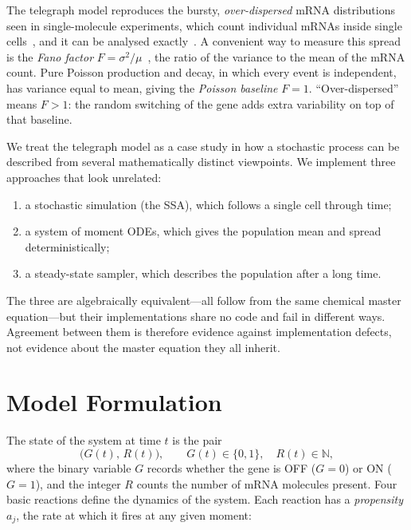 \documentclass[11pt]{article}
\begin{document}
The telegraph model reproduces the bursty, \emph{over-dispersed} mRNA distributions seen in single-molecule experiments,
which count individual mRNAs inside single cells~\cite{raj2006}, and it can be analysed exactly~\cite{peccoud1995}. 
A convenient way to measure this spread is the \emph{Fano factor} $F=\sigma^2/\mu$~\cite{fano1947}, the ratio of the variance to the mean of the mRNA count. 
Pure Poisson production and decay, in which every event is independent, has variance equal to mean, giving the \emph{Poisson baseline} $F=1$. 
``Over-dispersed'' means $F>1$: the random switching of the gene adds extra variability on top of that baseline.

We treat the telegraph model as a case study in how a stochastic process can be described from several mathematically distinct viewpoints. 
We implement three approaches that look unrelated:

\begin{enumerate}
  \item a stochastic simulation (the SSA), which follows a single cell through time;
  \item a system of moment ODEs, which gives the population mean and spread
    deterministically;
  \item a steady-state sampler, which describes the population after a long time.
\end{enumerate}

The three are algebraically equivalent---all follow from the same chemical master equation---but
their implementations share no code and fail in different ways. Agreement between them is therefore
evidence against implementation defects, not evidence about the master equation they all inherit.

\section{Model Formulation}
\label{sec:model}

The state of the system at time $t$ is the pair
\begin{equation}
  \big(G(t),\,R(t)\big), \qquad G(t)\in\{0,1\}, \quad R(t)\in\mathbb{N},
\end{equation}
where the binary variable $G$ records whether the gene is OFF ($G=0$) or ON
($G=1$), and the integer $R$ counts the number of mRNA molecules present.
 Four basic reactions define the dynamics of the system. 
 Each reaction has a \emph{propensity} $a_j$, the rate at which it fires at any given moment:
\end{document}
